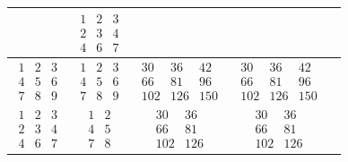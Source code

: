 \begin{table}[ht]
\begin{center}
\begin{threeparttable}
\begin{tabular}{|c|c|c|c|c|}
				&
				$\begin{matrix}
					1 & 2 & 3\\
					2 & 3 & 4\\
					4 & 6 & 7
				\end{matrix}$  \\ 
				\hline
				$\begin{matrix}
					1 & 2 & 3\\
					4 & 5 & 6\\
					7 & 8 & 9
				\end{matrix}$ 
				&  
				$\begin{matrix}
					1 & 2 & 3\\
					4 & 5 & 6\\
					7 & 8 & 9
				\end{matrix}$ 
				&
				$\begin{matrix}
					30 & 36 & 42\\
					66 & 81 & 96\\
					102 & 126 & 150
				\end{matrix}$ 
				&
				$\begin{matrix}
					30 & 36 & 42\\
					66 & 81 & 96\\
					102 & 126 & 150
				\end{matrix}$ \\ 
				\hline
				$\begin{matrix}
					1 & 2 & 3\\
					2 & 3 & 4\\
					4 & 6 & 7
				\end{matrix}$ 
				&  
				$\begin{matrix}
					1 & 2 \\
					4 & 5 \\
					7 & 8 
				\end{matrix}$
				&
				$\begin{matrix}
					30 & 36 \\
					66 & 81 \\
					102 & 126
				\end{matrix}$
				&
				$\begin{matrix}
					30 & 36 \\
					66 & 81 \\
					102 & 126
				\end{matrix}$ \\ 
				\hline
			\end{tabular}
		\end{threeparttable}
	\end{center}
\end{table}

